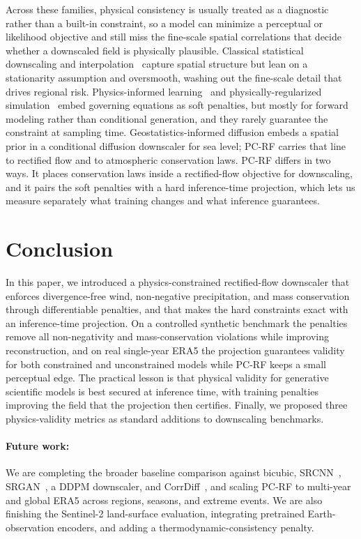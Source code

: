 \documentclass[letterpaper,withtimes]{easychair}
\newcommand{\pcrf}{\textsc{PC-RF}\xspace}
\begin{document}
Across these families, physical consistency is usually treated as a diagnostic rather than a built-in constraint, so a model can minimize a perceptual or likelihood objective and still miss the fine-scale spatial correlations that decide whether a downscaled field is physically plausible. Classical statistical downscaling and interpolation~\citep{maraun2018statistical,vandal2017deepsd} capture spatial structure but lean on a stationarity assumption and oversmooth, washing out the fine-scale detail that drives regional risk. Physics-informed learning~\citep{raissi2019physics} and physically-regularized simulation~\citep{kochkov2021machine,kohler2020equivariant} embed governing equations as soft penalties, but mostly for forward modeling rather than conditional generation, and they rarely guarantee the constraint at sampling time. Geostatistics-informed diffusion embeds a spatial prior in a conditional diffusion downscaler for sea level; \pcrf carries that line to rectified flow and to atmospheric conservation laws. \pcrf differs in two ways. It places conservation laws inside a rectified-flow objective for downscaling, and it pairs the soft penalties with a hard inference-time projection, which lets us measure separately what training changes and what inference guarantees.

\section{Conclusion}
\label{sec:conclusion}
In this paper, we introduced a physics-constrained rectified-flow downscaler that enforces divergence-free wind, non-negative precipitation, and mass conservation through differentiable penalties, and that makes the hard constraints exact with an inference-time projection. On a controlled synthetic benchmark the penalties remove all non-negativity and mass-conservation violations while improving reconstruction, and on real single-year ERA5 the projection guarantees validity for both constrained and unconstrained models while \pcrf keeps a small perceptual edge. The practical lesson is that physical validity for generative scientific models is best secured at inference time, with training penalties improving the field that the projection then certifies. Finally, we proposed three physics-validity metrics as standard additions to downscaling benchmarks.

\paragraph{Future work:}
We are completing the broader baseline comparison against bicubic, SRCNN~\citep{dong2015image}, SRGAN~\citep{ledig2017photo}, a DDPM downscaler, and CorrDiff~\citep{mardani2023residual}, and scaling \pcrf to multi-year and global ERA5 across regions, seasons, and extreme events. We are also finishing the Sentinel-2 land-surface evaluation, integrating pretrained Earth-observation encoders, and adding a thermodynamic-consistency penalty.
\end{document}
